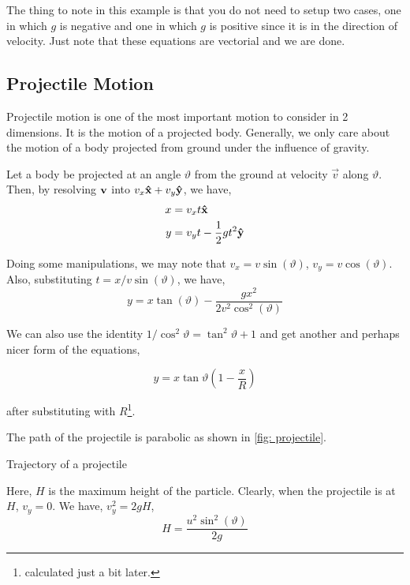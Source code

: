 The thing to note in this example is that you do not need to setup two cases, one in which
\(g\) is negative and one in which \(g\) is positive since it is in the direction of velocity. 
Just note that these equations are vectorial and we are done.


\subsection{Projectile Motion}

Projectile motion is one of the most important motion to consider in 
2 dimensions. It is the motion of a projected body. Generally, we
only care about the motion of a body projected from ground under the influence
of gravity. 

Let a body be projected at an angle \(\vartheta\) from the ground at velocity \(\vec{v}\)
along \(\vartheta\). Then, by resolving \(\boldsymbol{\mathbf{v}}\) into \(v_x \boldsymbol{\mathbf{\hat{x}}} + v_y\boldsymbol{\mathbf{\hat{y}}}\),
we have, 
\begin{align*}
    x &= v_xt \boldsymbol{\mathbf{\hat{x}}} \\
    y &= v_yt - \frac{1}{2}gt^2 \boldsymbol{\mathbf{\hat{y}}}
\end{align*}

Doing some manipulations, we may note that \(v_x = v\sin(\vartheta)\), \(v_y = v\cos(\vartheta)\).
Also, substituting \(t = x/v\sin(\vartheta)\), we have,
\begin{equation}
    \boxed{y = x\tan(\vartheta) - \frac{gx^2}{2v^2\cos^2(\vartheta)}}
\end{equation}

We can also use the identity \(1/\cos^2\vartheta = \tan^2\vartheta + 1\) and get another and 
perhaps nicer form of the equations,

\begin{equation}
    \boxed{y = x\tan\vartheta\left(1 - \frac{x}{R}\right)}
\end{equation}

after substituting with \(R\)\footnote{calculated just a bit later.}.

The path of the projectile is parabolic as shown in \cref{fig: projectile}.

\begin{marginfigure}
    \vspace{2em}
    \centering
    \caption{Trajectory of a projectile}
    \label{fig: projectile}
\end{marginfigure}

Here, \(H\) is the maximum height of the particle. Clearly,
when the projectile is at \(H\), \(v_y = 0\). We have, 
\(v_y^2 = 2gH\),
\begin{equation}
    H = \frac{u^2\sin^2(\vartheta)}{2g}
\end{equation}

